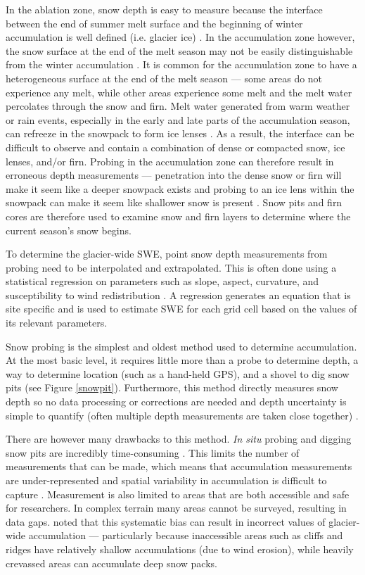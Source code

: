 \documentclass[12pt]{article}
\begin{document}
In the ablation zone, snow depth is easy to measure because the interface between the end of summer melt surface and the beginning of winter accumulation is well defined (i.e. glacier ice) \citep{McGrath2015}. In the accumulation zone however, the snow surface at the end of the melt season may not be easily distinguishable from the winter accumulation \citep{Grunewald2010}. It is common for the accumulation zone to have a heterogeneous surface at the end of the melt season --- some areas do not experience any melt,  while other areas experience some melt and the melt water percolates through the snow and firn. Melt water generated from warm weather or rain events, especially in the early and late parts of the accumulation season, can refreeze in the snowpack to form ice lenses \citep{Sold2014}. As a result, the interface can be difficult to observe and contain a combination of dense or compacted snow, ice lenses, and/or firn.  Probing in the accumulation zone can therefore result in erroneous depth measurements --- penetration into the dense snow or firn will make it seem like a deeper snowpack exists and probing to an ice lens within the snowpack can make it seem like shallower snow is present \citep{Sold2013}. Snow pits and firn cores are therefore used to examine snow and firn layers to determine where the current season's snow begins.

To determine the glacier-wide SWE, point snow depth measurements from probing need to be interpolated and extrapolated. This is often done using a statistical regression on parameters such as slope, aspect, curvature, and susceptibility to wind redistribution \citep[e.g.][]{Wheler2014,McGrath2015}. A regression generates an equation that is site specific and is used to estimate SWE for each grid cell based on the values of its relevant parameters. 

Snow probing is the simplest and oldest method used to determine accumulation. At the most basic level, it requires little more than a probe to determine depth, a way to determine location (such as a hand-held GPS), and a shovel to dig snow pits (see Figure \ref{snowpit}). Furthermore, this method directly measures snow depth so no data processing or corrections are needed and depth uncertainty is simple to quantify (often multiple depth measurements are taken close together) \citep{Sold2013}. 

There are however many drawbacks to this method. \textit{In situ} probing and digging snow pits are incredibly time-consuming \citep{Deems2006}. This limits the number of measurements that can be made, which means that accumulation measurements are under-represented and spatial variability in accumulation is difficult to capture \citep{Sold2014}. Measurement is also limited to areas that are both accessible and safe for researchers. In complex terrain many areas cannot be surveyed, resulting in data gaps. \cite{Sold2013} noted that this systematic bias can result in incorrect values of glacier-wide accumulation --- particularly because inaccessible areas such as cliffs and ridges have relatively shallow accumulations (due to wind erosion), while heavily crevassed areas can accumulate deep snow packs. 
\end{document}
